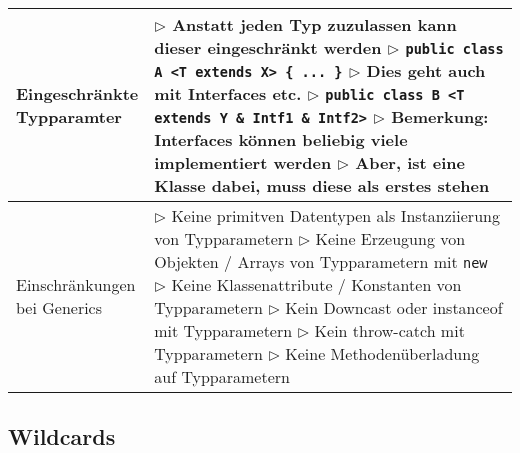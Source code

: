 \begin{table}[H]
\begin{tabular}{ | p{4cm} p{13.5cm} | }
	\end{tabular}
	\end{table}


	\begin{table}[H]
	\begin{tabular}{ | p{4cm} p{13.5cm} | }
	
	\hline
	\makecell[l]{Eingeschränkte \\ Typparamter} & 
	\makecell[l]
	{
	$\rhd$ Anstatt jeden Typ zuzulassen kann dieser eingeschränkt werden \\
	$\rhd$ \texttt{public class A <T extends X> \{ ... \}} \\
	$\rhd$ Dies geht auch mit Interfaces etc. \\
	$\rhd$ \texttt{public class B <T extends Y \& Intf1 \& Intf2>} \\
	$\rhd$ Bemerkung: Interfaces können beliebig viele implementiert werden \\
	$\rhd$ Aber, ist eine Klasse dabei, muss diese als erstes stehen \\
	} 	\\ \hline


	\makecell[l]{Einschränkungen \\ bei Generics} & 
	\makecell[l]
	{
	$\rhd$ Keine primitven Datentypen als Instanziierung von Typparametern \\
	$\rhd$ Keine Erzeugung von Objekten / Arrays von Typparametern mit \texttt{new} \\
	$\rhd$ Keine Klassenattribute / Konstanten von Typparametern \\
	$\rhd$ Kein Downcast oder instanceof mit Typparametern \\
	$\rhd$ Kein throw-catch mit Typparametern \\ 
	$\rhd$ Keine Methodenüberladung auf Typparametern \\
	} 	\\ \hline


	\end{tabular}
	\end{table}



\subsection{Wildcards}


